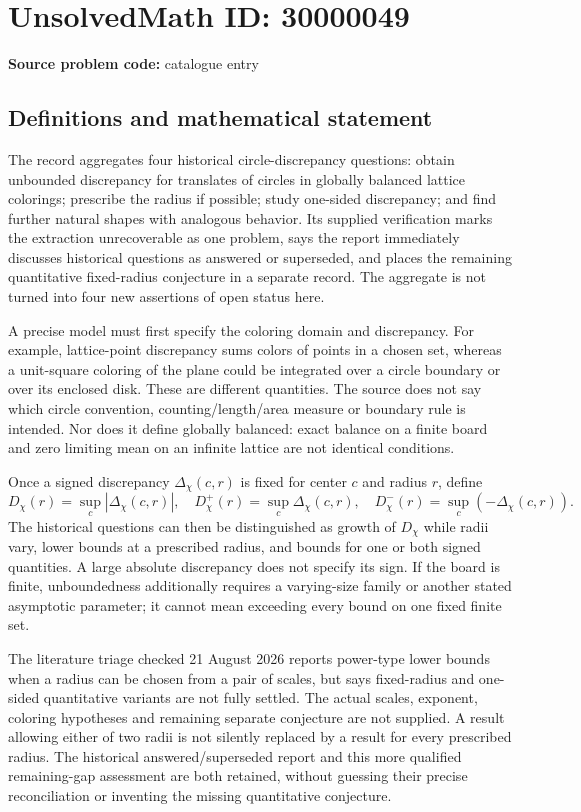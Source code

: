 \documentclass[11pt]{article}
\begin{document}
\section*{UnsolvedMath ID: 30000049}
\textbf{Source problem code:} catalogue entry
\subsection{Definitions and mathematical statement}
The record aggregates four historical circle-discrepancy questions: obtain unbounded discrepancy for translates of circles in globally balanced lattice colorings; prescribe the radius if possible; study one-sided discrepancy; and find further natural shapes with analogous behavior. Its supplied verification marks the extraction unrecoverable as one problem, says the report immediately discusses historical questions as answered or superseded, and places the remaining quantitative fixed-radius conjecture in a separate record. The aggregate is not turned into four new assertions of open status here.

A precise model must first specify the coloring domain and discrepancy. For example, lattice-point discrepancy sums colors of points in a chosen set, whereas a unit-square coloring of the plane could be integrated over a circle boundary or over its enclosed disk. These are different quantities. The source does not say which circle convention, counting/length/area measure or boundary rule is intended. Nor does it define globally balanced: exact balance on a finite board and zero limiting mean on an infinite lattice are not identical conditions.

Once a signed discrepancy $\Delta_\chi(c,r)$ is fixed for center $c$ and radius $r$, define
\[
 D_\chi(r)=\sup_c|\Delta_\chi(c,r)|,
 \quad D_\chi^+(r)=\sup_c\Delta_\chi(c,r),
 \quad D_\chi^-(r)=\sup_c(-\Delta_\chi(c,r)).
\]
The historical questions can then be distinguished as growth of $D_\chi$ while radii vary, lower bounds at a prescribed radius, and bounds for one or both signed quantities. A large absolute discrepancy does not specify its sign. If the board is finite, unboundedness additionally requires a varying-size family or another stated asymptotic parameter; it cannot mean exceeding every bound on one fixed finite set.

The literature triage checked 21 August 2026 reports power-type lower bounds when a radius can be chosen from a pair of scales, but says fixed-radius and one-sided quantitative variants are not fully settled. The actual scales, exponent, coloring hypotheses and remaining separate conjecture are not supplied. A result allowing either of two radii is not silently replaced by a result for every prescribed radius. The historical answered/superseded report and this more qualified remaining-gap assessment are both retained, without guessing their precise reconciliation or inventing the missing quantitative conjecture.
\end{document}
